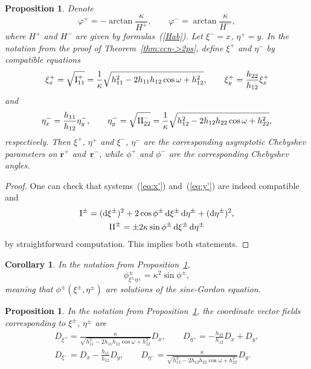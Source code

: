 \documentclass[pdftex]{sigma}
\let\ve\mathbf
\def\rmref#1{{\rm\ref{#1}}}
\def\h#1#2{h_{#1#2}}
\def\f{\omega}
\def\k{\kappa}
\def\omegaa{\varphi^+}
\def\omegab{\varphi^-}
\def\eqref#1{{\rm(\ref{#1})}}
\newtheorem{Corollary}[Theorem]{Corollary}
\newtheorem{Proposition}[Theorem]{Proposition}
 { \theoremstyle{definition}
\newtheorem{construction}[Theorem]{Construction}
\newtheorem{Definition}[Theorem]{Definition}
\newtheorem{Example}[Theorem]{Example}
\newtheorem{Remark}[Theorem]{Remark} }
\numberwithin{equation}{section}
\def\dif{\mathop{}\!\mathrm d}
\begin{document}
\begin{Proposition} \label{prop:xieta}
Denote
\[
\omegaa = -{\arctan} \frac{\k}{H^+},
\qquad
\omegab = {\arctan} \frac{\k}{H^-},
\]
where $H^+$ and $H^-$ are given by formulas~\eqref{Hab}.
Let  $\xi^- = x$, $\eta^+ = y$.
In the notation from the proof of Theorem~{\rm \ref{thm:ccn->2ps}},
define $\xi^+$ and $\eta^-$ by compatible equations
\begin{gather}\label{eq:x'}
\xi^+_x = \sqrt{{\rm I}^+_{11}}
 = \frac{1}{\k} \sqrt{\h11^2 - 2\h11\h12 \cos\f + \h12^2},
\qquad
\xi^+_y = \frac{\h22}{\h12} \xi^+_x
\end{gather}
and
\begin{gather}\label{eq:y'}
\eta^-_x = \frac{\h11}{\h12} \eta^-_y,
\qquad
\eta^-_y = \sqrt{{\rm II}^-_{22}}
 = \frac{1}{\k} \sqrt{\h12^2 - 2\h12\h22 \cos\f + \h22^2},
\end{gather}
respectively.
Then $\xi^+$, $\eta^+$ and $\xi^-$, $\eta^-$ are the corresponding asymptotic
Chebyshev parameters on $\ve r^+$ and~$\ve r^-$, while
$\phi^+$ and $\phi^-$ are the corresponding Chebyshev angles.
\end{Proposition}

\begin{proof}
One can check that systems~\eqref{eq:x'} and~\eqref{eq:y'} are indeed compatible and
\begin{gather*}
{\rm I}^\pm = (\dif\xi^\pm)^2 + 2 \cos\phi^\pm \dif\xi^\pm \dif\eta^\pm + (\dif\eta^\pm)^2, \\
{\rm II}^\pm = \pm 2 \k \sin\phi^\pm \dif\xi^\pm \dif\eta^\pm
\end{gather*}
by straightforward computation.
This implies both statements.
\end{proof}

\begin{Corollary} %
In the notation from Proposition~\rmref{prop:xieta},
\[ %
\phi^\pm_{\xi^\pm \eta^\pm} = \k^2 \sin\phi^\pm,
\]
meaning that $\phi^\pm(\xi^\pm,\eta^\pm)$ are solutions of the
sine-Gordon equation.
\end{Corollary}

\begin{Proposition}\label{prop:D:xieta}
In the notation from Proposition~\rmref{prop:xieta},
the coordinate vector fields corresponding to $\xi^\pm$, $\eta^\pm$ are
\begin{gather*}
D_{\xi^+} = \frac{\k}
  {\sqrt{h_{11}^2 - 2 h_{11} h_{12} \cos\omega + h_{12}^2}} D_x,
 \qquad D_{\eta^+} = -\frac{h_{22}}{h_{12}} D_x + D_y,
\\
D_{\xi^-} = D_x - \frac{h_{11}}{h_{12}} D_y,
 \qquad D_{\eta^-} = \frac{\k}
  {\sqrt{\h12^2 - 2\h12\h22 \cos\f + \h22^2}} D_y.
\end{gather*}
\end{Proposition}
\end{document}
